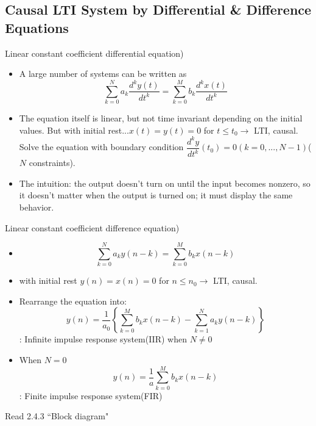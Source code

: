 \documentclass{article}
\begin{document}
\subsection{Causal LTI System by Differential \& Difference Equations}

Linear constant coefficient differential equation)
\begin{itemize}

\item A large number of systems can be written as
\[\sum_{k=0}^{N}{a_k\frac{d^ky(t)}{dt^k}} = \sum_{k=0}^{M}{b_k\frac{d^kx(t)}{dt^k}}\]
\item The equation itself is linear, but not time invariant depending on the initial values.
But with initial rest...$x(t)=y(t)=0$ for $t\leq t_0 \rightarrow$ LTI, causal.
Solve the equation with boundary condition $\dfrac{d^k y}{dt^k}(t_0)=0(k=0,...,N-1)$($N$ constraints).
\item The intuition: the output doesn't turn on until the input becomes nonzero, so it doesn't matter when the output is turned on; it must display the same behavior.
\end{itemize}
Linear constant coefficient difference equation)
\begin{itemize}
\item \[\sum_{k=0}^{N}{a_ky(n-k)} = \sum_{k=0}^{M}{b_kx(n-k)}\]
\item with initial rest $y(n) = x(n) = 0$ for $n \leq n_0\rightarrow$ LTI, causal.
\item Rearrange the equation into:
\[y(n) = \frac{1}{a_0}\left\{\sum_{k=0}^{M}{b_kx(n-k)}-\sum_{k=1}^{N}{a_ky(n-k)}\right\}\]: Infinite impulse response system(IIR) when $N \neq 0$
\item When $N = 0$
\[y(n) = \frac{1}{a}\sum_{k=0}^{M}{b_kx(n-k)}\]: Finite impulse response system(FIR)
\end{itemize}
Read 2.4.3 ``Block diagram"  %
\end{document}
